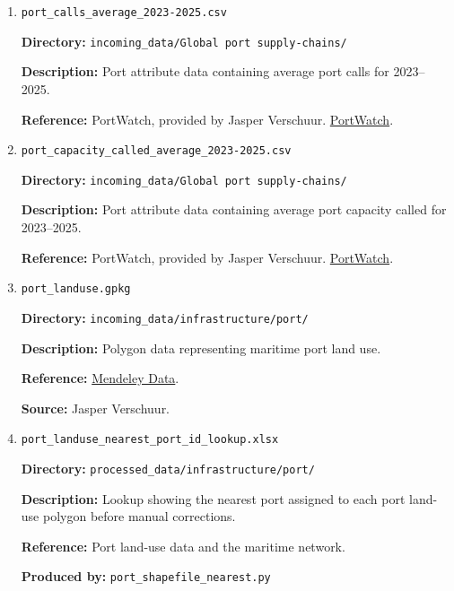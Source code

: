 \documentclass[11pt,a4paper]{article}
\begin{document}
\begin{enumerate}
\medskip

\item \texttt{port\_calls\_average\_2023-2025.csv}\par
\textbf{Directory:} \texttt{incoming\_data/Global port supply-chains/}\par
\textbf{Description:} Port attribute data containing average port calls for 2023--2025.\par
\textbf{Reference:} PortWatch, provided by Jasper Verschuur. \href{https://portwatch.imf.org/}{PortWatch}.\par

\medskip

\item \texttt{port\_capacity\_called\_average\_2023-2025.csv}\par
\textbf{Directory:} \texttt{incoming\_data/Global port supply-chains/}\par
\textbf{Description:} Port attribute data containing average port capacity called for 2023--2025.\par
\textbf{Reference:} PortWatch, provided by Jasper Verschuur. \href{https://portwatch.imf.org/}{PortWatch}.\par

\medskip

\item \texttt{port\_landuse.gpkg}\par
\textbf{Directory:} \texttt{incoming\_data/infrastructure/port/}\par
\textbf{Description:} Polygon data representing maritime port land use.\par
\textbf{Reference:} \href{https://data.mendeley.com/datasets/kdyt24tsh5/1}{Mendeley Data}.\par
\textbf{Source:} Jasper Verschuur.\par

\medskip

\item \texttt{port\_landuse\_nearest\_port\_id\_lookup.xlsx}\par
\textbf{Directory:} \texttt{processed\_data/infrastructure/port/}\par
\textbf{Description:} Lookup showing the nearest port assigned to each port land-use polygon before manual corrections.\par
\textbf{Reference:} Port land-use data and the maritime network.\par
\textbf{Produced by:} \texttt{port\_shapefile\_nearest.py}\par


\end{enumerate}
\end{document}
